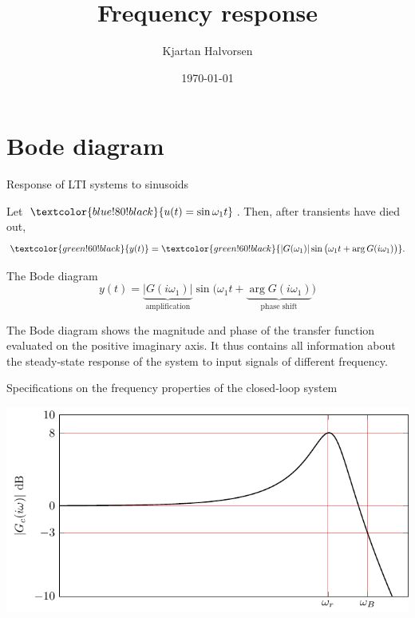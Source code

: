 \documentclass[presentation,aspectratio=169]{beamer}
\author{Kjartan Halvorsen}
\date{\today}
\title{Frequency response}
\def\ucolor{blue!80!black}
\def\ycolor{green!60!black}
\newcommand*{\incolor}[1]{\textcolor{\ucolor}{#1}}
\newcommand*{\outcolor}[1]{\textcolor{\ycolor}{#1}}
\begin{document}
\maketitle

\section{Bode diagram}
\label{sec:org3884654}

\begin{frame}[label={sec:org190f69c}]{Response of LTI systems to sinusoids}
\begin{center}
\end{center}

Let \(\incolor{u(t) = \sin\omega_1 t}\). Then, after transients have died out,
\[ \outcolor{y(t)}= \outcolor{|G(\omega_1)| \sin \big( \omega_1 t + \arg G(i\omega_1)\big)}. \]
\end{frame}


\begin{frame}[label={sec:org9403cb3}]{The Bode diagram}
\[ y(t) = \underbrace{|G(i\omega_1)|}_{\text{amplification}} \sin \big( \omega_1 t + \underbrace{\arg G(i\omega_1)}_{\text{phase shift}} \big) \]

The Bode diagram shows the magnitude and phase of the transfer function evaluated on the positive imaginary axis. It thus contains all information about the steady-state response of the system to input signals of different frequency.
\end{frame}


\begin{frame}[label={sec:org8cadac4}]{Specifications on the frequency properties of the closed-loop system}
\begin{center}
\includegraphics[width=0.899\linewidth]{../../figures/spec-bode-closed-loop-new}
\end{center}
\end{frame}
\end{document}
